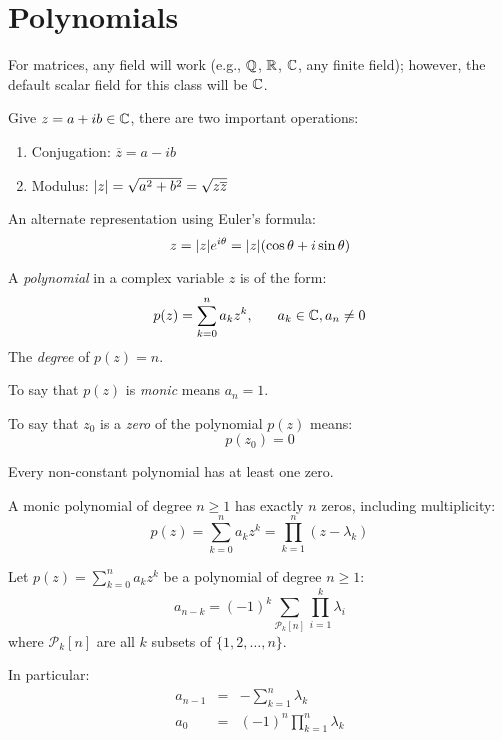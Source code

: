 \documentclass[letterpaper,12pt,fleqn]{article}
\newcommand{\conj}[1]{\overline{#1}}
\begin{document}
\section*{Polynomials}

For matrices, any field will work (e.g., $\mathbb{Q}$, $\mathbb{R}$, $\mathbb{C}$, any finite
field); however, the default scalar field for this class will be $\mathbb{C}$.

Give $z=a+ib\in\mathbb{C}$, there are two important operations:
\begin{enumerate}
\item Conjugation: $\conj{z}=a-ib$
\item Modulus: $\abs{z}=\sqrt{a^2+b^2}=\sqrt{z\conj{z}}$
\end{enumerate}

An alternate representation using Euler's formula:
\[z=\lvert z\rvert e^{i\theta}=\lvert z\rvert(\cos{\theta}+i\sin{\theta})\]

\begin{definition}
  A \emph{polynomial} in a complex variable $z$ is of the form:
  \[p(z)=\sum_{k=0}^na_kz^k,\hspace{4ex}a_k\in\mathbb{C}, a_n\ne0\]
  The \emph{degree} of $p(z)=n$.

  To say that $p(z)$ is \emph{monic} means $a_n=1$.
\end{definition}

\begin{definition}
  To say that $z_0$ is a \emph{zero} of the polynomial $p(z)$ means:
  \[p(z_0)=0\]
\end{definition}

\begin{theorem}
  Every non-constant polynomial has at least one zero.
\end{theorem}

\begin{corollary}
  A monic polynomial of degree $n\ge1$ has exactly $n$ zeros, including multiplicity:
  \[p(z)=\sum_{k=0}^na_kz^k=\prod_{k=1}^n(z-\lambda_k)\]
\end{corollary}

\begin{theorem}
  Let $p(z)=\sum_{k=0}^na_kz^k$ be a polynomial of degree $n\ge1$:
  \[a_{n-k}=(-1)^k\sum_{\mathcal{P}_k[n]}\prod_{i=1}^k\lambda_i\]
  where $\mathcal{P}_k[n]$ are all $k$ subsets of $\{1,2,\ldots,n\}$.

  In particular:
  \begin{eqnarray*}
    a_{n-1} &=& -\sum_{k=1}^n\lambda_k \\
    a_0 &=& (-1)^n\prod_{k=1}^n\lambda_k
  \end{eqnarray*}
\end{theorem}
\end{document}
